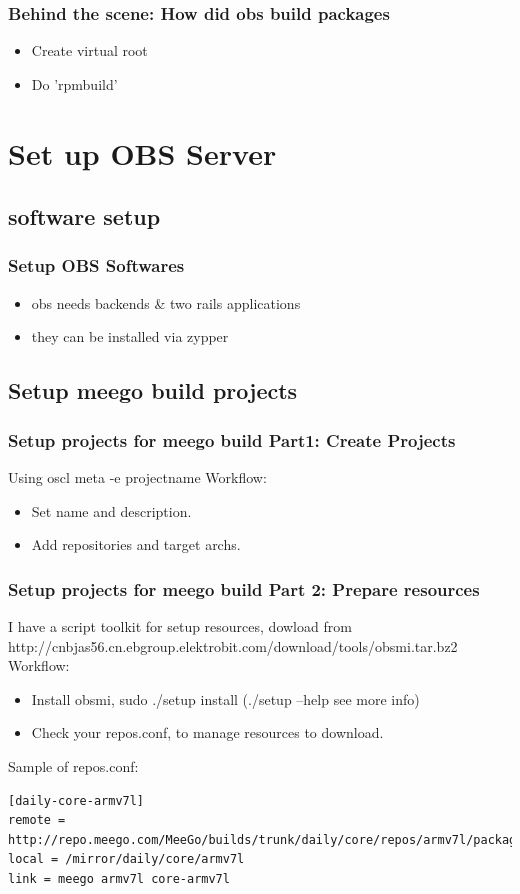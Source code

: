 \documentclass{beamer}
\begin{document}
\begin{frame}
  \frametitle{Behind the scene: How did obs build packages}
  \begin{itemize}
    \item Create virtual root
    \item Do 'rpmbuild'
  \end{itemize}
\end{frame}

\section{Set up OBS Server}
\subsection{software setup}
\begin{frame}
  \frametitle{Setup OBS Softwares}
  \begin{itemize}
    \item obs needs backends \& two rails applications
    \item they can be installed via zypper
  \end{itemize}
\end{frame}

\subsection{Setup meego build projects}

\begin{frame}
  \frametitle{Setup projects for meego build Part1: Create Projects}
  Using oscl meta -e projectname
  Workflow:\\
  \begin{itemize}
    \item Set name and description.
    \item Add repositories and target archs.
  \end{itemize}

\end{frame}

\begin{frame} [fragile]
  \frametitle{Setup projects for meego build Part 2: Prepare resources}
  I have a script toolkit for setup resources, dowload from http://cnbjas56.cn.ebgroup.elektrobit.com/download/tools/obsmi.tar.bz2 \\
  Workflow:\\
  \begin{itemize}
    \item Install obsmi, sudo ./setup install (./setup --help see more info)
    \item Check your repos.conf, to manage resources to download.
  \end{itemize}
  Sample of repos.conf: \\
  \lstset{language=}
  \begin{lstlisting}
[daily-core-armv7l]
remote = http://repo.meego.com/MeeGo/builds/trunk/daily/core/repos/armv7l/packages
local = /mirror/daily/core/armv7l
link = meego armv7l core-armv7l
  \end{lstlisting}
\end{frame}
\end{document}
